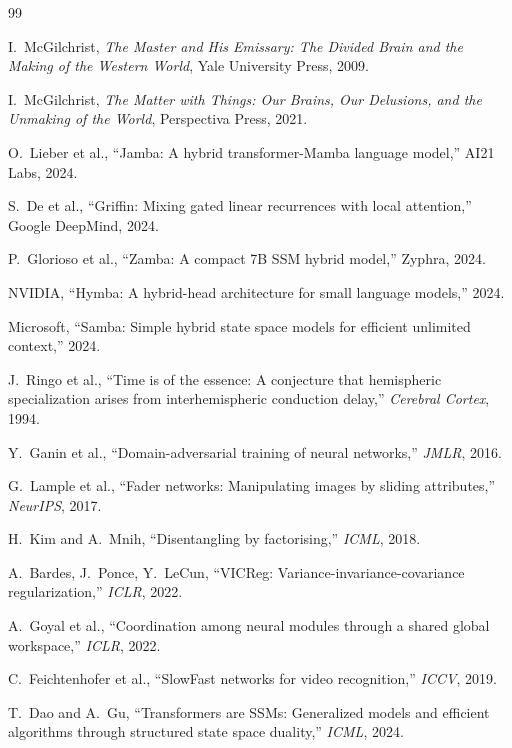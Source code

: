 \documentclass[11pt, a4paper]{article}
\theoremstyle{plain}
\theoremstyle{definition}
\theoremstyle{remark}
\begin{document}
\begin{thebibliography}{99}

I.~McGilchrist,
\emph{The Master and His Emissary: The Divided Brain and the Making of the Western World},
Yale University Press, 2009.

I.~McGilchrist,
\emph{The Matter with Things: Our Brains, Our Delusions, and the Unmaking of the World},
Perspectiva Press, 2021.

O.~Lieber et al., ``Jamba: A hybrid transformer-Mamba language model,'' AI21 Labs, 2024.

S.~De et al., ``Griffin: Mixing gated linear recurrences with local attention,'' Google DeepMind, 2024.

P.~Glorioso et al., ``Zamba: A compact 7B SSM hybrid model,'' Zyphra, 2024.

NVIDIA, ``Hymba: A hybrid-head architecture for small language models,'' 2024.

Microsoft, ``Samba: Simple hybrid state space models for efficient unlimited context,'' 2024.

J.~Ringo et al., ``Time is of the essence: A conjecture that hemispheric specialization arises from interhemispheric conduction delay,'' \emph{Cerebral Cortex}, 1994.

Y.~Ganin et al., ``Domain-adversarial training of neural networks,'' \emph{JMLR}, 2016.

G.~Lample et al., ``Fader networks: Manipulating images by sliding attributes,'' \emph{NeurIPS}, 2017.

H.~Kim and A.~Mnih, ``Disentangling by factorising,'' \emph{ICML}, 2018.

A.~Bardes, J.~Ponce, Y.~LeCun, ``VICReg: Variance-invariance-covariance regularization,'' \emph{ICLR}, 2022.

A.~Goyal et al., ``Coordination among neural modules through a shared global workspace,'' \emph{ICLR}, 2022.

C.~Feichtenhofer et al., ``SlowFast networks for video recognition,'' \emph{ICCV}, 2019.

T.~Dao and A.~Gu, ``Transformers are SSMs: Generalized models and efficient algorithms through structured state space duality,'' \emph{ICML}, 2024.


\end{thebibliography}
\end{document}
